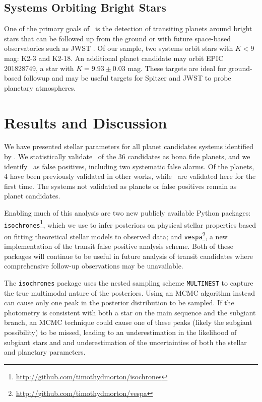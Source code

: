 \subsection{Systems Orbiting Bright Stars}

One of the primary goals of \KT\ is the detection of transiting planets around bright stars that
can be followed up from the ground or with future space-based observatories such as JWST
\citep{Howell14}.
Of our sample, two systems orbit stars with $K < 9$ mag: K2-3 \citep{Crossfield15} and
K2-18.
An additional planet candidate may orbit EPIC 201828749, a star with $K = 9.93 \pm 0.03$ mag.
These targets are ideal for ground-based followup and may be useful targets for Spitzer and
JWST to probe planetary atmospheres.

\section{Results and Discussion}

We have presented stellar parameters for all planet candidates systems identified by
\paperit.
We statistically validate \Nvalidated\ of the 36 candidates as bona fide planets, and we
identify \Nfp\ as false positives, including two systematic false alarms.
Of the planets, 4 have been previously validated in other works, while \Nvalnew\ are
validated here for the first time.
The systems not validated as planets or false positives remain as planet candidates.

Enabling much of this analysis are two new publicly available Python packages:
\texttt{isochrones}\footnote{\url{http://github.com/timothydmorton/isochrones}},
which we use to infer posteriors on physical stellar properties based
on fitting theoretical stellar models to observed data; and \texttt{vespa}\footnote{
\url{http://github.com/timothydmorton/vespa}}, a
new implementation of the \citet{Morton12} transit false positive analysis scheme.
Both of these packages will continue to be useful in future analysis of transit candidates
where comprehensive follow-up observations may be unavailable.

The \texttt{isochrones} package uses the nested sampling scheme 
\texttt{MULTINEST} to capture the true multimodal nature of the posteriors.
Using an MCMC algorithm instead can cause only one peak in the posterior
distribution to be sampled. 
If the photometry is consistent with both a star on the main sequence and the
subgiant branch, an MCMC technique could cause one of these peaks (likely the
subgiant possibility) to be missed, leading to an underestimation in the likelihood
of subgiant stars and and underestimation of the uncertainties of both the stellar and planetary 
parameters. 


